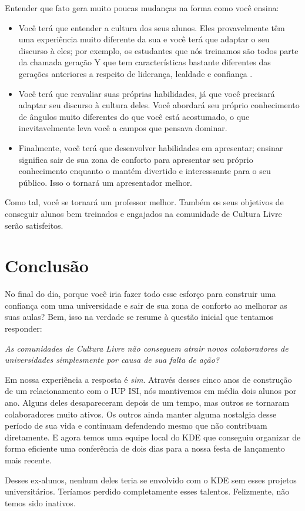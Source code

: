 Entender que fato gera muito poucas mudanças na forma como você ensina:
\begin{itemize}
  \item Você terá que entender a cultura dos seus alunos. Eles provavelmente têm
uma experiência muito diferente da sua e você terá que adaptar o seu discurso
à eles; por exemplo, os estudantes que nós treinamos são todos parte da chamada
geração Y que tem características bastante diferentes das gerações anteriores
a respeito de liderança, lealdade e confiança .
  \item Você terá que reavaliar suas próprias habilidades, já que você precisará
adaptar seu discurso à cultura deles. Você abordará seu próprio conhecimento de
ângulos muito diferentes do que você está acostumado, o que inevitavelmente leva
você a campos que pensava dominar.
  \item Finalmente, você terá que desenvolver habilidades em apresentar; ensinar
significa sair de sua zona de conforto para apresentar seu próprio conhecimento
enquanto o mantém divertido e interesssante para o seu público. Isso o tornará um
apresentador melhor.
\end{itemize}

Como tal, você se tornará um professor melhor. Também os seus objetivos de conseguir
alunos bem treinados e engajados na comunidade de Cultura Livre serão satisfeitos.

\section*{Conclusão}
No final do dia, porque você iria fazer todo esse esforço para construir uma confiança
com uma universidade e sair de sua zona de conforto ao melhorar as suas aulas?
Bem, isso na verdade se resume à questão inicial que tentamos responder:

\emph{As comunidades de Cultura Livre não conseguem atrair novos colaboradores de
universidades simplesmente por causa de sua falta de ação?}

Em nossa experiência a resposta é \emph{sim}. Através desses cinco anos de construção
de um relacionamento com o IUP ISI, nós mantivemos em média dois alunos por ano. 
Alguns deles desapareceram depois de um tempo, mas outros se tornaram colaboradores
muito ativos. Os outros ainda manter alguma nostalgia desse período de sua vida e
continuam defendendo mesmo que não contribuam diretamente. E agora temos uma equipe
local do KDE que conseguiu organizar de forma eficiente uma conferência de dois dias
para a nossa festa de lançamento mais recente.

Desses ex-alunos, nenhum deles teria se envolvido com o KDE sem esses projetos
universitários. Teríamos perdido completamente esses talentos. 
Felizmente, não temos sido inativos.